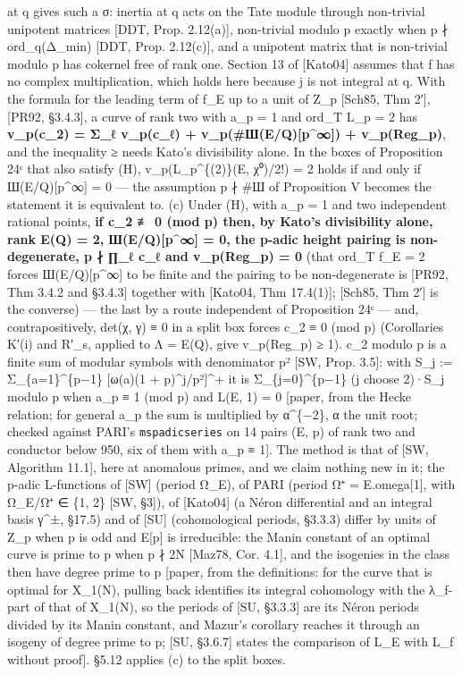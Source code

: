 \documentclass[11pt,a4paper]{article}
\theoremstyle{named}
\begin{document}
at q gives such a σ: inertia at q acts on the Tate module through non-trivial unipotent matrices [DDT, Prop. 2.12(a)], non-trivial modulo p exactly when p ∤ ord\_q(Δ\_min) [DDT, Prop. 2.12(c)], and a unipotent matrix that is non-trivial modulo p has cokernel free of rank one. Section 13 of [Kato04] assumes that f has no complex multiplication, which holds here because j is not integral at q. With the formula for the leading term of f\_E up to a unit of Z\_p [Sch85, Thm 2′], [PR92, §3.4.3], a curve of rank two with a\_p = 1 and ord\_T L\_p = 2 has \textbf{v\_p(c\_2) = Σ\_ℓ v\_p(c\_ℓ) + v\_p(\#Ш(E/Q)[p\textasciicircum{}∞]) + v\_p(Reg\_p)}, and the inequality ≥ needs Kato's divisibility alone. In the boxes of Proposition 24ᶜ that also satisfy (H), v\_p(L\_p\textasciicircum{}\{(2)\}(E, χ⁰)/2!) = 2 holds if and only if Ш(E/Q)[p\textasciicircum{}∞] = 0 — the assumption p ∤ \#Ш of Proposition V becomes the statement it is equivalent to. (c) Under (H), with a\_p = 1 and two independent rational points, \textbf{if c\_2 ≢ 0 (mod p) then, by Kato's divisibility alone, rank E(Q) = 2, Ш(E/Q)[p\textasciicircum{}∞] = 0, the p-adic height pairing is non-degenerate, p ∤ ∏\_ℓ c\_ℓ and v\_p(Reg\_p) = 0} (that ord\_T f\_E = 2 forces Ш(E/Q)[p\textasciicircum{}∞] to be finite and the pairing to be non-degenerate is [PR92, Thm 3.4.2 and §3.4.3] together with [Kato04, Thm 17.4(1)]; [Sch85, Thm 2′] is the converse) — the last by a route independent of Proposition 24ᶜ — and, contrapositively, det(χ, γ) ≡ 0 in a split box forces c\_2 ≡ 0 (mod p) (Corollaries K′(i) and R′\_s, applied to Λ = E(Q), give v\_p(Reg\_p) ≥ 1). c\_2 modulo p is a finite sum of modular symbols with denominator p² [SW, Prop. 3.5]: with S\_j := Σ\_\{a=1\}\textasciicircum{}\{p−1\} [ω(a)(1 + p)\textasciicircum{}j/p²]\textasciicircum{}+ it is Σ\_\{j=0\}\textasciicircum{}\{p−1\} (j choose 2)·S\_j modulo p when a\_p ≡ 1 (mod p) and L(E, 1) = 0 [paper, from the Hecke relation; for general a\_p the sum is multiplied by α\textasciicircum{}\{−2\}, α the unit root; checked against PARI's \texttt{mspadicseries} on 14 pairs (E, p) of rank two and conductor below 950, six of them with a\_p ≡ 1]. The method is that of [SW, Algorithm 11.1], here at anomalous primes, and we claim nothing new in it; the p-adic L-functions of [SW] (period Ω\_E), of PARI (period Ω⁺ = E.omega[1], with Ω\_E/Ω⁺ ∈ \{1, 2\} [SW, §3]), of [Kato04] (a Néron differential and an integral basis γ\textasciicircum{}±, §17.5) and of [SU] (cohomological periods, §3.3.3) differ by units of Z\_p when p is odd and E[p] is irreducible: the Manin constant of an optimal curve is prime to p when p ∤ 2N [Maz78, Cor. 4.1], and the isogenies in the class then have degree prime to p [paper, from the definitions: for the curve that is optimal for X\_1(N), pulling back identifies its integral cohomology with the λ\_f-part of that of X\_1(N), so the periods of [SU, §3.3.3] are its Néron periods divided by its Manin constant, and Mazur's corollary reaches it through an isogeny of degree prime to p; [SU, §3.6.7] states the comparison of L\_E with L\_f without proof]. §5.12 applies (c) to the split boxes.
\end{document}
